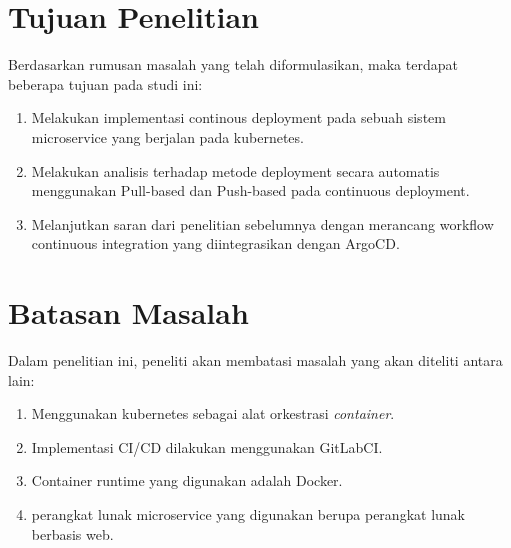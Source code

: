\section{Tujuan Penelitian}
Berdasarkan rumusan masalah yang telah diformulasikan, maka terdapat beberapa tujuan pada studi ini:
\begin{enumerate}[label=\alph*.]
    \item Melakukan implementasi continous deployment pada sebuah sistem microservice yang berjalan pada kubernetes.
    \item Melakukan analisis terhadap metode deployment secara automatis menggunakan Pull-based dan Push-based pada continuous deployment.
    \item Melanjutkan saran dari penelitian sebelumnya \cite{Ramadoni2021} dengan merancang  workflow continuous integration yang diintegrasikan dengan ArgoCD.
\end{enumerate}

\vspace{0.5cm}
\section{Batasan Masalah}
Dalam penelitian ini, peneliti akan membatasi masalah yang akan diteliti antara lain:
\begin{enumerate}[label=\alph*.]
    \item Menggunakan kubernetes sebagai alat orkestrasi \textit{container}.
    \item Implementasi CI/CD dilakukan menggunakan GitLabCI.
    \item Container runtime yang digunakan adalah Docker.
    \item perangkat lunak microservice yang digunakan berupa perangkat lunak berbasis web.
\end{enumerate}
\newpage
